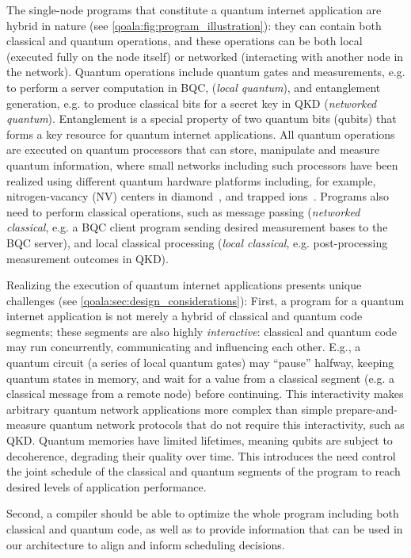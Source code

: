 The single-node programs that constitute a quantum internet application are hybrid in nature (see \cref{qoala:fig:program_illustration}):
they can contain both classical and quantum operations, and these operations can be both local (executed fully on the node itself) or networked (interacting with another node in the network).
Quantum operations include quantum gates and measurements, e.g. to perform a server computation in BQC, (\textit{local quantum}), and entanglement generation, e.g. to produce classical bits for a secret key in QKD (\textit{networked quantum}).
Entanglement is a special property of two quantum bits (qubits) that forms a key resource for quantum internet applications. 
All quantum operations are executed on quantum processors that can store, manipulate and measure quantum information, where small networks including such processors have been realized using different quantum hardware platforms including, for example,  nitrogen-vacancy (NV) centers in diamond~\cite{pompili2021realization}, and trapped ions~\cite{krutyanskiy2023entanglement}.
Programs also need to perform classical operations, such as message passing (\textit{networked classical}, e.g. a BQC client program sending desired measurement bases to the BQC server), and local classical processing (\textit{local classical}, e.g. post-processing measurement outcomes in QKD).

Realizing the execution of quantum internet applications presents unique challenges (see \cref{qoala:sec:design_considerations}): 
First, a program for a quantum internet application is not merely a hybrid of classical and quantum code segments; these segments are also highly \textit{interactive}: classical and quantum code may run concurrently, communicating and influencing each other.
E.g., a quantum circuit (a series of local quantum gates) may ``pause'' halfway, keeping quantum states in memory, and wait for a value from a classical segment (e.g. a classical message from a remote node) before continuing.
This interactivity makes arbitrary quantum network applications more complex than simple prepare-and-measure quantum network protocols that do not require this interactivity, such as QKD.
Quantum memories have limited lifetimes, meaning qubits are subject to decoherence, degrading their quality over time. This introduces the need 
control the joint schedule of the classical and quantum segments of the program to reach desired levels of application performance.

Second, a compiler should be able to optimize the whole program including both classical and quantum code, as well as to provide information that can be used in our architecture to align and inform scheduling decisions. 

